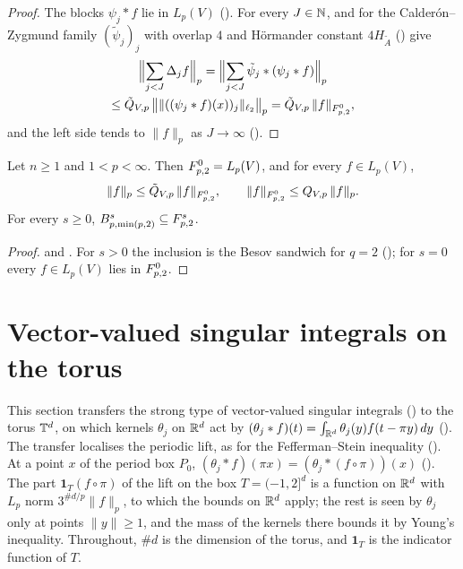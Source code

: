 \begin{proof}
\leanok
The blocks $\psi_j * f$ lie in $L_p(V)$ (). For every $J \in \mathbb{N}$,
 and
 for the Calder\'on--Zygmund family $(\tilde\psi_j)_j$ with
overlap $4$ and H\"ormander constant $4 H_{\tilde A}$ () give
\begin{multline*}
  \Bigl\| \sum_{j < J} \Delta_j f \Bigr\|_p
  = \Bigl\| \sum_{j < J} \tilde\psi_j * (\psi_j * f) \Bigr\|_p \\
  \leq \tilde Q_{V,p} \, \bigl\| \|((\psi_j * f)(x))_j\|_{\ell_2} \bigr\|_p
  = \tilde Q_{V,p} \, \|f\|_{F^{0}_{p,2}} ,
\end{multline*}
and the left side tends to $\|f\|_p$ as $J \to \infty$ ().
\end{proof}

\begin{corollary}
\label{cor:square-function-theorem}
\leanok
{}
Let $n \geq 1$ and $1 < p < \infty$. Then $F^{0}_{p,2} = L_p(V)$, and for every
$f \in L_p(V)$,
\[
  \|f\|_p \leq \tilde Q_{V,p} \, \|f\|_{F^{0}_{p,2}} , \qquad
  \|f\|_{F^{0}_{p,2}} \leq Q_{V,p} \, \|f\|_p .
\]
For every $s \geq 0$, $B^{s}_{p,\min(p,2)} \subseteq F^{s}_{p,2}$.
\end{corollary}

\begin{proof}
\leanok
{} and . For $s > 0$ the inclusion
is the Besov sandwich for $q = 2$ (); for $s = 0$ every
$f \in L_p(V)$ lies in $F^{0}_{p,2}$.
\end{proof}

\section{Vector-valued singular integrals on the torus}
\label{sec:torus-singular-integrals}

This section transfers the strong type of vector-valued singular integrals
() to the torus $\mathbb{T}^d$, on which kernels $\theta_j$ on
$\mathbb{R}^d$ act by $(\theta_j * f)(t) = \int_{\mathbb{R}^d} \theta_j(y) f(t - \pi y) \, dy$
(). The transfer localises the periodic lift, as for the Fefferman--Stein
inequality (). At a point $x$ of the period box $P_0$,
$(\theta_j * f)(\pi x) = (\theta_j * (f \circ \pi))(x)$ (). The part
$\mathbf 1_T (f \circ \pi)$ of the lift on the box $T = (-1, 2]^d$ is a function on $\mathbb{R}^d$ with
$L_p$ norm $3^{\#d/p} \|f\|_p$, to which the bounds on $\mathbb{R}^d$ apply; the rest is seen by
$\theta_j$ only at points $\|y\| \geq 1$, and the mass of the kernels there bounds it by Young's
inequality. Throughout, $\#d$ is the dimension of the torus, and $\mathbf 1_T$ is the indicator
function of $T$.

